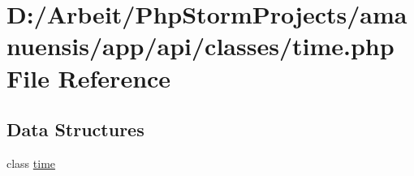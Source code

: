 \hypertarget{time_8php}{}\section{D\+:/\+Arbeit/\+Php\+Storm\+Projects/amanuensis/app/api/classes/time.php File Reference}
\label{time_8php}
\subsection*{Data Structures}
\begin{DoxyCompactItemize}
\item 
class \hyperlink{classtime}{time}
\end{DoxyCompactItemize}
